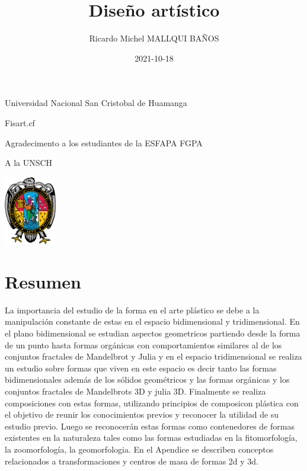 \documentclass[16pt,]{krantz}
\title{Diseño artístico}
\author{Ricardo Michel MALLQUI BAÑOS}
\institute{Universidad Nacional San Cristóbal De Huamanga}
\date{2021-10-18}
\theoremstyle{definition}
\theoremstyle{definition}
\theoremstyle{definition}
\theoremstyle{definition}
\theoremstyle{remark}
\begin{document}
\maketitle

\thispagestyle{empty}
\begin{flushright}
Universidad Nacional San Cristobal de Huamanga

Fisart.cf

Agradecimento a los estudiantes de la ESFAPA FGPA

A la UNSCH

\includegraphics[height=3cm]{U.pdf}
\end{flushright}

{
\hypersetup{linkcolor=}
\setcounter{tocdepth}{2}
\tableofcontents
}
\listoftables
\listoffigures
\newcommand{\N}{\mathbb{N}}
\newcommand{\R}{\mathbb{R}}
\newcommand{\CC}{\mathbb{C}}
\newcommand{\I}{\mathbb{I}}
\newcommand{\f}{\mathbb{f}}
\newcommand{\X}{\mathbb{X}}
\newcommand{\D}{\mathbb{D}}
\newcommand{\Z}{\mathbb{Z}}
\newcommand{\Q}{\mathbb{Q}}
\newcommand{\norm}[1]{\left\Vert#1\right\Vert}
\newcommand{\abs}[1]{\left\vert#1\right\vert}
\newcommand{\set}[1]{\left\{#1\right\}}
\newcommand{\seq}[1]{\left<#1\right>}
\newcommand{\co}[1]{\left[#1\right]}
\newcommand{\cc}[1]{\left(#1\right)}
\newcommand{\J}{\mathcal{J}}
\newcommand{\K}{\mathcal{K}}
\newcommand{\M}{\mathcal{M}}
\newcommand{\F}{\mathcal{F}}

\hypertarget{resumen}{%
\chapter*{Resumen}\label{resumen}}


La importancia del estudio de la forma en el arte plástico se debe a la manipulación constante de estas en el espacio bidimensional y tridimensional. En el plano bidimensional se estudian aspectos geometricos partiendo desde la forma de un punto hasta formas orgánicas con comportamientos similares al de los conjuntos fractales de Mandelbrot y Julia y en el espacio tridimensional se realiza un estudio sobre formas que viven en este espacio es decir tanto las formas bidimensionales además de los sólidos geométricos y las formas orgánicas y los conjuntos fractales de Mandelbrots 3D y julia 3D. Finalmente se realiza composiciones con estas formas, utilizando principios de composicon plástica con el objetivo de reunir los conocimientos previos y reconocer la utilidad de su estudio previo. Luego se reconocerán estas formas como contenedores de formas existentes en la naturaleza tales como las formas estudiadas en la fitomorfología, la zoomorfología, la geomorfologia. En el Apendice se describen conceptos relacionados a transformaciones y centros de masa de formas 2d y 3d.
\end{document}

